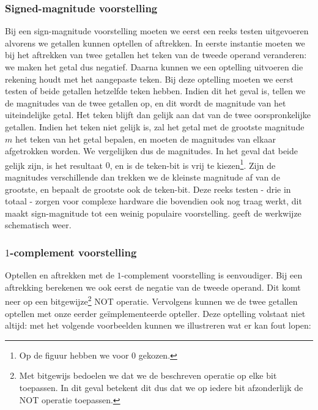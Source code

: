 \subsubsection{Signed-magnitude voorstelling}
Bij een sign-magnitude voorstelling moeten we eerst een reeks testen uitgevoeren alvorens we getallen kunnen optellen of aftrekken. In eerste instantie moeten we bij het aftrekken van twee getallen het teken van de tweede operand veranderen: we maken het getal dus negatief. Daarna kunnen we een optelling uitvoeren die rekening houdt met het aangepaste teken. Bij deze optelling moeten we eerst testen of beide getallen hetzelfde teken hebben. Indien dit het geval is, tellen we de magnitudes van de twee getallen op, en dit wordt de magnitude van het uiteindelijke getal. Het teken blijft dan gelijk aan dat van de twee oorspronkelijke getallen. Indien het teken niet gelijk is, zal het getal met de grootste magnitude $m$ het teken van het getal bepalen, en moeten de magnitudes van elkaar afgetrokken worden. We vergelijken dus de magnitudes. In het geval dat beide gelijk zijn, is het resultaat $0$, en is de teken-bit is vrij te kiezen\footnote{Op de figuur hebben we voor $0$ gekozen.}. Zijn de magnitudes verschillende dan trekken we de kleinste magnitude af van de grootste, en bepaalt de grootste ook de teken-bit. Deze reeks testen - drie in totaal - zorgen voor complexe hardware die bovendien ook nog traag werkt, dit maakt sign-magnitude tot een weinig populaire voorstelling.  geeft de werkwijze schematisch weer.

\subsubsection{$1$-complement voorstelling}
Optellen en aftrekken met de $1$-complement voorstelling is eenvoudiger. Bij een aftrekking berekenen we ook eerst de negatie van de tweede operand. Dit komt neer op een bitgewijze\footnote{Met bitgewijs bedoelen we dat we de beschreven operatie op elke bit toepassen. In dit geval betekent dit dus dat we op iedere bit afzonderlijk de NOT operatie toepassen.} NOT operatie. Vervolgens kunnen we de twee getallen optellen met onze eerder ge\"implementeerde opteller. Deze optelling volstaat niet altijd: met het volgende voorbeelden kunnen we illustreren wat er kan fout lopen:

